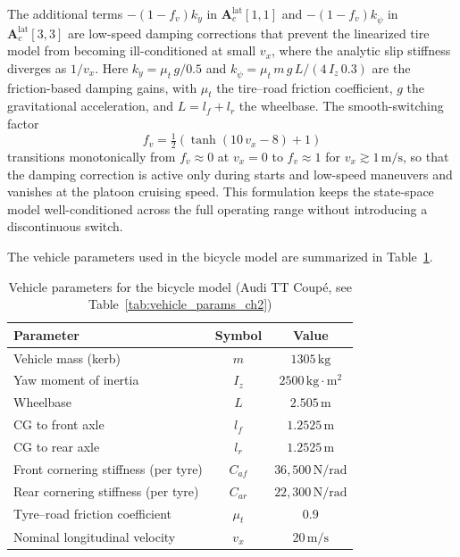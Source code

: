 \documentclass[12pt,a4paper,oneside]{report}
\begin{document}
The additional terms $-(1 - f_v) k_{\dot{y}}$ in $\mathbf{A}_c^{\text{lat}}[1,1]$ and $-(1 - f_v) k_{\dot{\psi}}$ in $\mathbf{A}_c^{\text{lat}}[3,3]$ are low-speed damping corrections that prevent the linearized tire model from becoming ill-conditioned at small $v_x$, where the analytic slip stiffness diverges as $1/v_x$. Here $k_{\dot{y}} = \mu_t \, g / 0.5$ and $k_{\dot{\psi}} = \mu_t \, m \, g \, L / (4 \, I_z \, 0.3)$ are the friction-based damping gains, with $\mu_t$ the tire--road friction coefficient, $g$ the gravitational acceleration, and $L = l_f + l_r$ the wheelbase. The smooth-switching factor
\begin{equation}
f_v = \tfrac{1}{2}\left( \tanh(10 \, v_x - 8) + 1 \right)
\label{eq:fv_switch}
\end{equation}
transitions monotonically from $f_v \approx 0$ at $v_x = 0$ to $f_v \approx 1$ for $v_x \gtrsim 1\,\mathrm{m/s}$, so that the damping correction is active only during starts and low-speed maneuvers and vanishes at the platoon cruising speed. This formulation keeps the state-space model well-conditioned across the full operating range without introducing a discontinuous switch.

The vehicle parameters used in the bicycle model are summarized in Table~\ref{tab:vehicle_params}.

\begin{table}[ht]
\centering
\begin{tabular}{|l|c|c|}
\hline
\textbf{Parameter} & \textbf{Symbol} & \textbf{Value} \\
\hline
Vehicle mass (kerb) & $m$ & $1305\,\mathrm{kg}$ \\
Yaw moment of inertia & $I_z$ & $2500\,\mathrm{kg \cdot m^2}$ \\
Wheelbase & $L$ & $2.505\,\mathrm{m}$ \\
CG to front axle & $l_f$ & $1.2525\,\mathrm{m}$ \\
CG to rear axle & $l_r$ & $1.2525\,\mathrm{m}$ \\
Front cornering stiffness (per tyre) & $C_{af}$ & $36{,}500\,\mathrm{N/rad}$ \\
Rear cornering stiffness (per tyre)  & $C_{ar}$ & $22{,}300\,\mathrm{N/rad}$ \\
Tyre--road friction coefficient & $\mu_t$ & $0.9$ \\
Nominal longitudinal velocity & $v_x$ & $20\,\mathrm{m/s}$ \\
\hline
\end{tabular}
\caption{Vehicle parameters for the bicycle model (Audi TT Coup\'{e}, see Table~\ref{tab:vehicle_params_ch2})}
\label{tab:vehicle_params}
\end{table}
\end{document}
